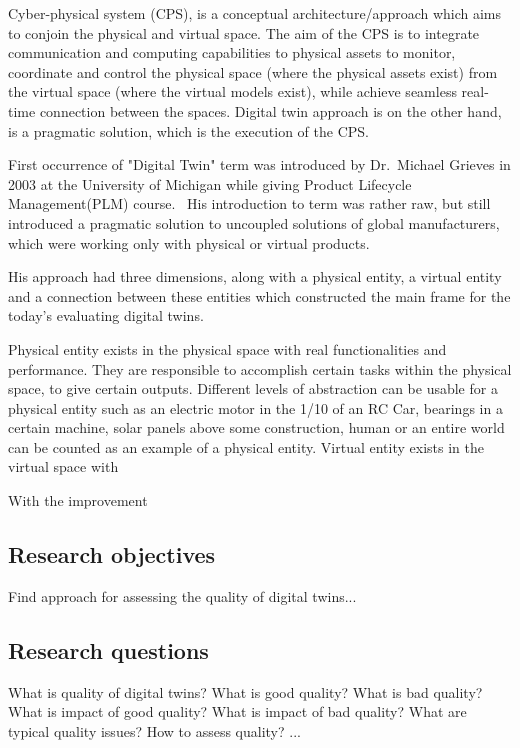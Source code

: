 \documentclass[conference]{IEEEtran}
\begin{document}
    Cyber-physical system (CPS), is a conceptual architecture/approach which aims to conjoin the physical and virtual space. 
    The aim of the CPS is to integrate communication and computing capabilities to physical assets to monitor, coordinate and control the physical space (where the physical assets exist) from the virtual space (where the virtual models exist), while achieve seamless real-time connection between the spaces.
    Digital twin approach is on the other hand, is a pragmatic solution, which is the execution of the CPS.~\cite{TAO20193}
    
    First occurrence of "Digital Twin" term  was introduced by Dr.~Michael Grieves in 2003 at the University of Michigan while giving  Product Lifecycle Management(PLM) course.~\cite{article}
    His introduction to term was rather raw, but still introduced a pragmatic solution to uncoupled solutions of global manufacturers, which were working only with physical or virtual products.

    His approach had three dimensions, along with a physical entity, a virtual entity and a connection between these entities which constructed the main frame for the today's evaluating digital twins.~\cite{article}

    Physical entity exists in the physical space with real functionalities and performance. They are responsible to accomplish certain tasks within the physical space, to give certain outputs.
    Different levels of abstraction can be usable for a physical entity such as an electric motor in the 1/10 of an RC Car, bearings in a certain machine, solar panels above some construction, human or an entire world can be counted as an example of a physical entity.
    Virtual entity exists in the virtual space with 

    With the improvement 
    

    \subsection{Research objectives}

    Find approach for assessing the quality of digital twins...

    \subsection{Research questions}

    What is quality of digital twins? What is good quality? What is bad quality? What is impact of good quality? What is impact of bad quality? What are typical quality issues? How to assess quality? ...
\end{document}
